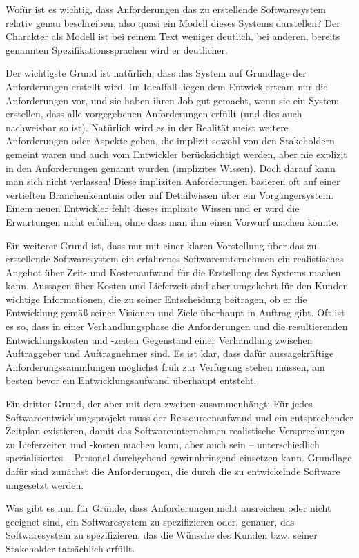 Wofür ist es wichtig, dass Anforderungen das zu erstellende Softwaresystem relativ genau beschreiben, also quasi ein Modell dieses Systems darstellen? Der Charakter als Modell ist bei reinem Text weniger deutlich, bei anderen, bereits genannten Spezifikationssprachen wird er deutlicher.

Der wichtigste Grund ist natürlich, dass das System auf Grundlage der Anforderungen erstellt wird. Im Idealfall liegen dem Entwicklerteam nur die Anforderungen vor, und sie haben ihren Job gut gemacht, wenn sie ein System erstellen, dass alle vorgegebenen Anforderungen erfüllt (und dies auch nachweisbar so ist). Natürlich wird es in der Realität meist weitere Anforderungen oder Aspekte geben, die implizit sowohl von den Stakeholdern gemeint waren und auch vom Entwickler berücksichtigt werden, aber nie explizit in den Anforderungen genannt wurden (implizites \mbox{Wissen}). Doch darauf kann man sich nicht verlassen! Diese impliziten Anforderungen basieren oft auf einer vertieften Branchenkenntnis oder auf Detailwissen über ein Vorgängersystem. Einem neuen Entwickler fehlt dieses implizite Wissen und er wird die Erwartungen nicht erfüllen, ohne dass man ihm einen Vorwurf machen 
\linebreak %
könnte.

Ein weiterer Grund ist, dass nur mit einer klaren Vorstellung über das zu erstellende Softwaresystem ein erfahrenes Softwareunternehmen ein realistisches Angebot über Zeit- und Kostenaufwand für die Erstellung des Systems machen kann. Aussagen über Kosten und Lieferzeit sind aber umgekehrt für den Kunden wichtige Informationen, die zu seiner Entscheidung beitragen, ob er die Entwicklung gemäß seiner Visionen und Ziele überhaupt in Auftrag gibt. Oft ist es so, dass in einer Verhandlungsphase die Anforderungen und die resultierenden Entwicklungskosten und -zeiten Gegenstand einer Verhandlung zwischen Auftraggeber und Auftragnehmer sind. Es ist klar, dass dafür aussagekräftige Anforderungssammlungen möglichst früh zur Verfügung stehen müssen, am besten bevor ein Entwicklungsaufwand überhaupt entsteht.

Ein dritter Grund, der aber mit dem zweiten zusammenhängt: Für jedes Software\-entwicklungsprojekt muss der Ressourcenaufwand und ein entsprechender Zeitplan existieren, damit das Softwareunternehmen realistische Versprechungen zu Liefer\-zeiten und -kosten machen kann, aber auch sein -- unterschiedlich spezialisiertes -- Personal durchgehend gewinnbringend einsetzen kann. Grundlage dafür sind zunächst die Anforderungen, die durch die zu entwickelnde Software umgesetzt 
\linebreak %
werden.

Was gibt es nun für Gründe, dass Anforderungen nicht ausreichen oder nicht geeignet sind, ein Softwaresystem zu spezifizieren oder, genauer, das Softwaresystem zu spezifizieren, das die Wünsche des Kunden bzw. seiner Stakeholder tatsächlich erfüllt.